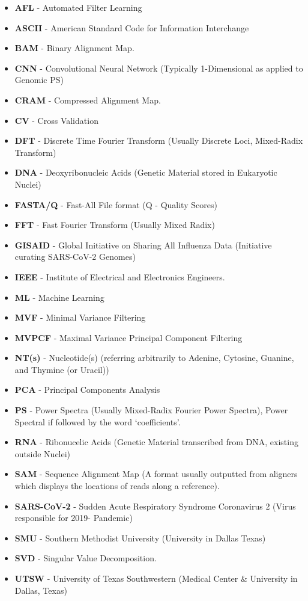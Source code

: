 \documentclass[10pt,conference]{IEEEtran}
\begin{document}
{\begin{itemize} 
\item \textbf{AFL} - Automated Filter Learning
\item \textbf{ASCII} - American Standard Code for Information Interchange
\item \textbf{BAM} - Binary Alignment Map. 
\item \textbf{CNN} - Convolutional Neural Network (Typically 1-Dimensional as applied to Genomic PS)
\item \textbf{CRAM} - Compressed Alignment Map.
\item \textbf{CV} - Cross Validation
\item \textbf{DFT} - Discrete Time Fourier Transform (Usually Discrete Loci, Mixed-Radix Transform)
\item \textbf{DNA} - Deoxyribonucleic Acids (Genetic Material stored in Eukaryotic Nuclei)
\item \textbf{FASTA/Q} - Fast-All File format (Q - Quality Scores)
\item \textbf{FFT} - Fast Fourier Transform (Usually Mixed Radix)
\item \textbf{GISAID} - Global Initiative on Sharing All Influenza Data (Initiative curating SARS-CoV-2 Genomes)
\item \textbf{IEEE} - Institute of Electrical and Electronics Engineers.
\item \textbf{ML} - Machine Learning
\item \textbf{MVF} - Minimal Variance Filtering
\item \textbf{MVPCF} - Maximal Variance Principal Component Filtering
\item \textbf{NT(s)} - Nucleotide(s) (referring arbitrarily to Adenine, Cytosine, Guanine, and Thymine (or Uracil))
\item \textbf{PCA} - Principal Components Analysis
\item \textbf{PS} - Power Spectra (Usually Mixed-Radix Fourier Power Spectra), Power Spectral  if followed by the word `coefficients'. 
\item \textbf{RNA} - Ribonucelic Acids (Genetic Material transcribed from DNA, existing outside Nuclei)
\item \textbf{SAM} - Sequence Alignment Map (A format usually outputted from aligners which displays the locations of reads along a reference). 
\item \textbf{SARS-CoV-2} - Sudden Acute Respiratory Syndrome Coronavirus 2 (Virus responsible for 2019- Pandemic)
\item \textbf{SMU} - Southern Methodist University (University in Dallas Texas) 
\item \textbf{SVD} - Singular Value Decomposition.
\item \textbf{UTSW} - University of Texas Southwestern (Medical Center \& University in Dallas, Texas)
\end{itemize}

}
\end{document}
